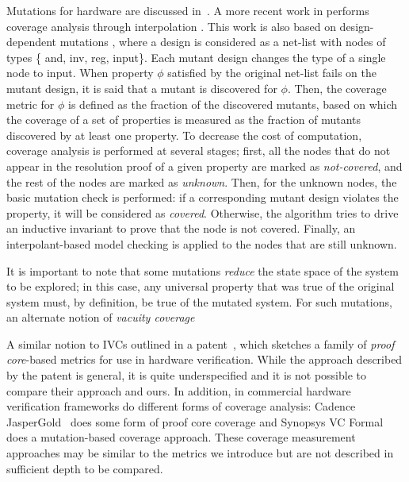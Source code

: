 \newcommand{\andnode}{{\sc and}}
\newcommand{\invnode}{{\sc inv}}
\newcommand{\inpnode}{{\sc inp}}
\newcommand{\regnode}{{\sc reg}}
\newcommand{\mutnode}{{\sc mut}}
\newcommand{\inputnode}{{\sc input}}

Mutations for hardware are discussed in~\cite{chockler2010coverage,Kupferman:2006:SCF,kupferman_theory_2008}. A more recent work in \cite{chockler2010coverage} performs coverage analysis through interpolation \cite{mcmillan2003interpolation}. This work is also based on design-dependent mutations \cite{chockler_coverage_2003}, where a design is considered as a net-list with nodes of types \{ \andnode, \invnode, \regnode, \inputnode \}.
Each mutant design changes the type of a single node to \inputnode . When property $\phi$ satisfied by the original net-list fails on the mutant design, it is said that a mutant is discovered for $\phi$.
Then, the coverage metric for $\phi$ is defined as the fraction of the discovered mutants, based on which the coverage of a set of properties is measured as the fraction of mutants discovered by at least one property.
To decrease the cost of computation, coverage analysis is performed at several stages; first, all the nodes that do not appear in the resolution proof of a given property are marked as \emph{not-covered}, and the rest of the nodes are marked as \emph{unknown}. Then, for the unknown nodes, the basic mutation check is performed: if a corresponding mutant design violates the property, it will be considered as \emph{covered}. Otherwise, the algorithm tries to drive an inductive invariant to prove that the node is not covered. Finally, an interpolant-based model checking is applied to the nodes that are still unknown.

It is important to note that some mutations {\em reduce} the state space of the system to be explored; in this case, any universal property that was true of the original system must, by definition, be true of the mutated system.  For such mutations, an alternate notion of {\em vacuity coverage}

A similar notion to IVCs outlined in a patent~\cite{hanna2015formal}, which sketches a family of {\em proof core}-based metrics for use in hardware verification.  While the approach described by the patent is general, it is quite underspecified and it is not possible to compare their approach and ours. In addition, in commercial hardware verification frameworks do different forms of coverage analysis: Cadence JasperGold~\cite{jasper_gold} does some form of proof core coverage and Synopsys VC Formal~\cite{Synopsys_VC_formal} does a mutation-based coverage approach.  These coverage measurement approaches may be similar to the metrics we introduce but are not described in sufficient depth to be compared.

